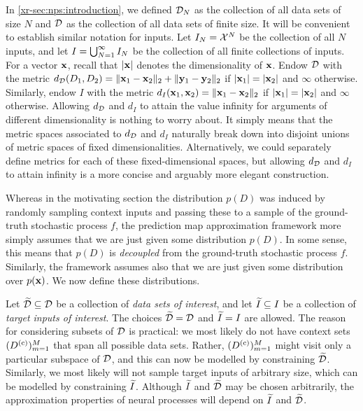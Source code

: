\documentclass[12pt, twoside]{report}
\newcommand{\xrprefix}[1]{xr-#1}
\begin{document}
In \cref{\xrprefix{sec:nps:introduction}}, we defined $\mathcal{D}_N$ as the collection of all data sets of size $N$ and $\mathcal{D}$ as the collection of all data sets of finite size.
It will be convenient to establish similar notation for inputs.
Let $I_N = \mathcal{X}^N$ be the collection of all $N$ inputs, and let $I = \bigcup_{N=1}^\infty I_N$ be the collection of all finite collections of inputs.
For a vector $\mathbf{x}$, recall that $\lvert\mathbf{x}\rvert$ denotes the dimensionality of $\mathbf{x}$.
Endow $\mathcal{D}$ with the metric
$d_{\mathcal{D}}(D_1, D_2) = \lVert\mathbf{x}_1 - \mathbf{x}_2\rVert_2 + \lVert\mathbf{y}_1 - \mathbf{y}_2\rVert_2$
if $\lvert\mathbf{x}_1\rvert = \lvert\mathbf{x}_2\rvert$ and $\infty$ otherwise.
Similarly, endow $I$ with the metric
$d_I(\mathbf{x}_1, \mathbf{x}_2) = \lVert\mathbf{x}_1 - \mathbf{x}_2\rVert_2$
if $\lvert\mathbf{x}_1\rvert = \lvert\mathbf{x}_2\rvert$ and $\infty$ otherwise.
Allowing $d_{\mathcal{D}}$ and $d_I$ to attain the value infinity for arguments of different dimensionality is nothing to worry about.
It simply means that the metric spaces associated to $d_{\mathcal{D}}$ and $d_I$ naturally break down into disjoint unions of metric spaces of fixed dimensionalities.
Alternatively, we could separately define metrics for each of these fixed-dimensional spaces, but allowing $d_{\mathcal{D}}$ and $d_I$ to attain infinity is a more concise and arguably more elegant construction.

Whereas in the motivating section the distribution $p(D)$ was induced by randomly sampling context inputs and passing these to a sample of the ground-truth stochastic process $f$,
the prediction map approximation framework more simply assumes that we are just given some distribution $p(D)$.
In some sense, this means that $p(D)$ is \emph{decoupled} from the ground-truth stochastic process $f$.
Similarly, the framework assumes also that we are just given some distribution over $p(\mathbf{x})$.
We now define these distributions.

Let $\widetilde{\mathcal{D}} \subseteq \mathcal{D}$ be a collection of \emph{data sets of interest},
and let $\widetilde{I} \subseteq I$ be a collection of \emph{target inputs of interest}.
The choices $\widetilde{\mathcal{D}} = \mathcal{D}$ and $\widetilde{I} = I$ are allowed.
The reason for considering subsets of $\mathcal{D}$ is practical:
we most likely do not have context sets $(D\us{(c)})_{m=1}^M$ that span all possible data sets.
Rather, $(D\us{(c)})_{m=1}^M$ might visit only a particular subspace of $\mathcal{D}$,
and this can now be modelled by constraining $\widetilde{\mathcal{D}}$.
Similarly, we most likely will not sample target inputs of arbitrary size, which can be modelled by constraining $\widetilde{I}$.
Although $\widetilde{I}$ and $\widetilde{\mathcal{D}}$ may be chosen arbitrarily,
the approximation properties of neural processes will depend on $\widetilde{I}$ and $\widetilde{\mathcal{D}}$.
\end{document}
